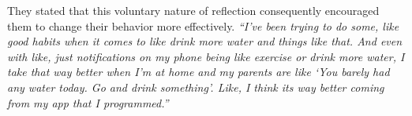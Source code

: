         They stated that this voluntary nature of reflection consequently encouraged them to change their behavior more effectively.
        \textit{``I've been trying to do some, like good habits when it comes to like drink more water and things like that. And even with like, just notifications on my phone being like exercise or drink more water, I take that way better when I'm at home and my parents are like `You barely had any water today. Go and drink something'. Like, I think its way better coming from my app that I programmed.''}
        


